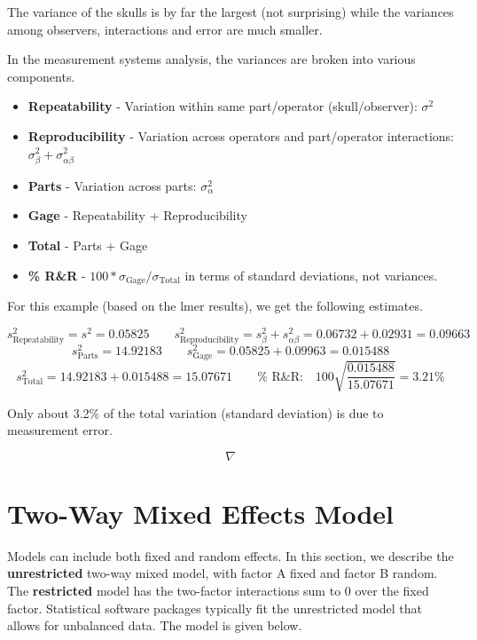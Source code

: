 \documentclass[
]{book}
\providecommand{\tightlist}{%
  \setlength{\itemsep}{0pt}\setlength{\parskip}{0pt}}
\begin{document}
The variance of the skulls is by far the largest (not surprising) while
the variances among observers, interactions and error are much smaller.

In the measurement systems analysis, the variances are broken into
various components.

\begin{itemize}
\tightlist
\item
  \textbf{Repeatability} - Variation within same part/operator
  (skull/observer): \(\sigma^2\)
\item
  \textbf{Reproducibility} - Variation across operators and
  part/operator interactions:
  \(\sigma_{\beta}^2+\sigma_{\alpha\beta}^2\)
\item
  \textbf{Parts} - Variation across parts: \(\sigma_{\alpha}^2\)
\item
  \textbf{Gage} - Repeatability + Reproducibility
\item
  \textbf{Total} - Parts + Gage
\item
  \textbf{\% R\&R} - \(100*\sigma_{\mbox{Gage}}/\sigma_{\mbox{Total}}\)
  in terms of standard deviations, not variances.
\end{itemize}

For this example (based on the lmer results), we get the following
estimates.

\[
s_{\mbox{Repeatability}}^2= s^2=0.05825 \qquad 
s_{\mbox{Reproducibility}}^2= s_{\beta}^2+s_{\alpha\beta}^2=0.06732+0.02931=0.09663
\] \[
s_{\mbox{Parts}}^2=14.92183  \qquad
s_{\mbox{Gage}}^2=0.05825+0.09963=0.015488
\] \[
s_{\mbox{Total}}^2=14.92183+0.015488=15.07671 \qquad
 \% \mbox{ R&R:} \quad
100\sqrt{\frac{0.015488}{15.07671}}=3.21\%
\]

Only about 3.2\% of the total variation (standard deviation) is due to
measurement error.

\[ \nabla \]

\section{Two-Way Mixed Effects Model}\label{two-way-mixed-effects-model}

Models can include both fixed and random effects. In this section, we
describe the \textbf{unrestricted} two-way mixed model, with factor A
fixed and factor B random. The \textbf{restricted} model has the
two-factor interactions sum to 0 over the fixed factor. Statistical
software packages typically fit the unrestricted model that allows for
unbalanced data. The model is given below.
\end{document}
